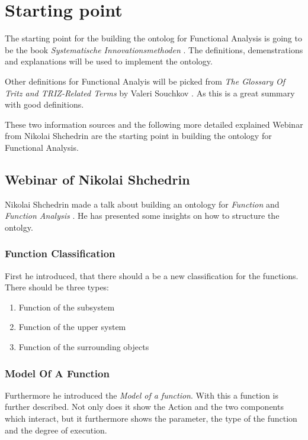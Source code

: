 \section{Starting point} 
\label{sec:starting_point}

The starting point for the building the ontolog for Functional Analysis is going to be the book \textit{Systematische Innovationsmethoden} \cite{KS}.
The definitions, demenstrations and explanations will be used to implement the ontology.

Other definitions for Functional Analyis will be picked from \textit{The Glossary Of Tritz and TRIZ-Related Terms} by Valeri Souchkov \cite{SouchkovGlossary}. 
As this is a great summary with good definitions.

These two information sources and the following more detailed explained Webinar from Nikolai Shchedrin are the starting point in building the ontology for Functional Analysis.


\subsection{Webinar of Nikolai Shchedrin}

Nikolai Shchedrin made a talk about building an ontology for \textit{Function} and \textit{Function Analysis} \cite{WebinarFunctionAnalysis}.
He has presented some insights on how to structure the ontolgy.

\subsubsection{Function Classification}
\label{subsubsec:function_classification}

First he introduced, that there should a be a new classification for the functions. 
There should be three types: 

\begin{enumerate}[noitemsep]
	\item Function of the subsystem
	\item Function of the upper system
	\item Function of the surrounding objects
\end{enumerate}

\subsubsection{Model Of A Function}

Furthermore he introduced the \textit{Model of a function}.
With this a function is further described. 
Not only does it show the Action and the two components which interact, but it furthermore shows the parameter, the type of the function and the degree of execution.

